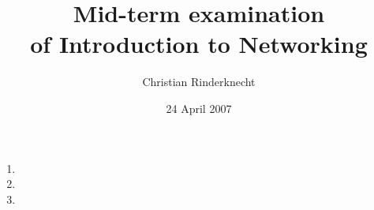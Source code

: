 \documentclass[11pt,a4paper]{article}
\title{Mid-term examination\\ of Introduction to Networking}
\author{Christian Rinderknecht}
\date{24 April 2007}
\begin{document}
\maketitle

\thispagestyle{empty}

\begin{enumerate}

  \item
    

  \item
    

  \item
    

\end{enumerate}
\end{document}
